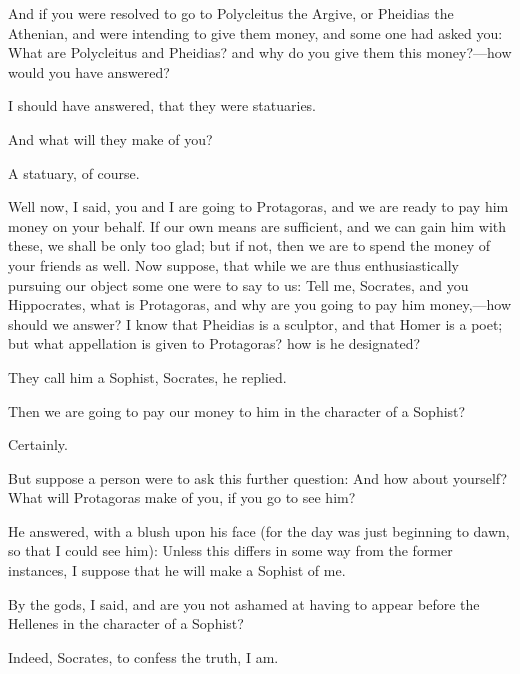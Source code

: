 \documentclass[11pt,letter]{article}
\begin{document}
\par  And if you were resolved to go to Polycleitus the Argive, or Pheidias the Athenian, and were intending to give them money, and some one had asked you: What are Polycleitus and Pheidias? and why do you give them this money?—how would you have answered?

\par  I should have answered, that they were statuaries.

\par  And what will they make of you?

\par  A statuary, of course.

\par  Well now, I said, you and I are going to Protagoras, and we are ready to pay him money on your behalf. If our own means are sufficient, and we can gain him with these, we shall be only too glad; but if not, then we are to spend the money of your friends as well. Now suppose, that while we are thus enthusiastically pursuing our object some one were to say to us: Tell me, Socrates, and you Hippocrates, what is Protagoras, and why are you going to pay him money,—how should we answer? I know that Pheidias is a sculptor, and that Homer is a poet; but what appellation is given to Protagoras? how is he designated?

\par  They call him a Sophist, Socrates, he replied.

\par  Then we are going to pay our money to him in the character of a Sophist?

\par  Certainly.

\par  But suppose a person were to ask this further question: And how about yourself? What will Protagoras make of you, if you go to see him?

\par  He answered, with a blush upon his face (for the day was just beginning to dawn, so that I could see him): Unless this differs in some way from the former instances, I suppose that he will make a Sophist of me.

\par  By the gods, I said, and are you not ashamed at having to appear before the Hellenes in the character of a Sophist?

\par  Indeed, Socrates, to confess the truth, I am.
\end{document}
